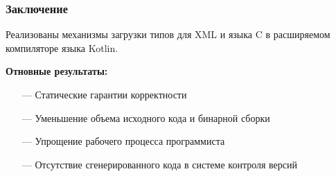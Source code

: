 \documentclass[12pt]{beamer}
\newcommand{\nl}{\vspace{\baselineskip}}
\begin{document}
\begin{frame}\frametitle{Заключение}
\begin{large}
Реализованы механизмы загрузки типов для XML и языка C в расширяемом компиляторе языка Kotlin. \nl

\textbf{Отновные результаты:}
    \begin{itemize}
        \item[---] Статические гарантии корректности
        \item[---] Уменьшение объема исходного кода и бинарной сборки
        \item[---] Упрощение рабочего процесса программиста
        \item[---] Отсутствие сгенерированного кода в системе контроля версий
    \end{itemize}
\end{large}
\end{frame}
\end{document}
